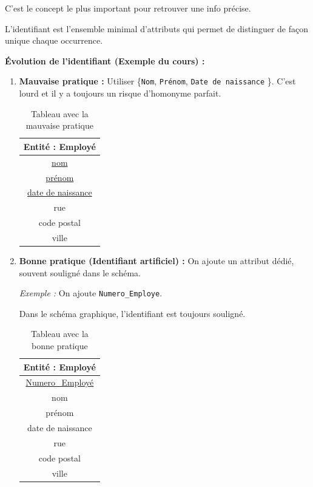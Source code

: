 C'est le concept le plus important pour retrouver une info précise.

\begin{definition}
L'identifiant est l'ensemble minimal d'attributs qui permet de distinguer de façon unique chaque occurrence.
\end{definition}

\textbf{Évolution de l'identifiant (Exemple du cours) :}

\begin{enumerate}
\item \textbf{Mauvaise pratique :} Utiliser \{\texttt{Nom}, \texttt{Prénom}, \texttt{Date de naissance} \}. C'est lourd et il y a toujours un risque d'homonyme parfait.

\begin{table}[h]
\centering
\begin{tabular}{|c|}
\hline
\textbf{Entité : Employé}  \\
\hline
\underline{nom}  \\
\underline{prénom}  \\
\underline{date de naissance} \\
rue \\
code postal  \\
ville  \\
\hline
\end{tabular}
\caption{ Tableau avec la mauvaise pratique }
\end{table}
\item \textbf{ Bonne pratique (Identifiant artificiel) :} On ajoute un attribut dédié, souvent souligné dans le schéma.

\textit{ Exemple : } On ajoute \texttt{Numero\_Employe}.

\smallskip

Dans le schéma graphique, l'identifiant est toujours souligné.

\begin{table}[h]
\centering
\begin{tabular}{|c|}
\hline
\textbf{Entité : Employé}  \\
\hline
\underline{Numero\_Employé} \\
nom  \\
prénom  \\
date de naissance \\
rue \\
code postal  \\
ville  \\
\hline
\end{tabular}
\caption{ Tableau avec la bonne pratique }
\end{table}
\end{enumerate}

